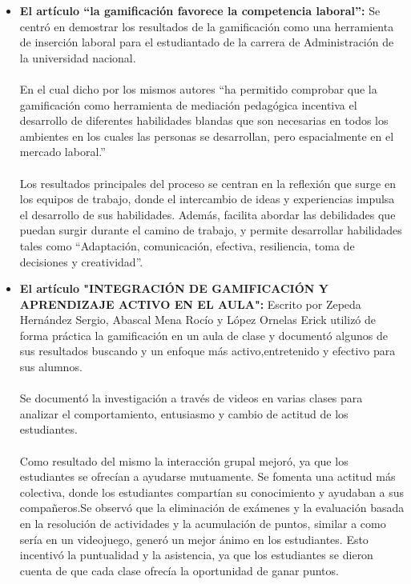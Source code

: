 \begin{itemize}
    \item \textbf{El artículo “la gamificación favorece la competencia laboral”:} Se centró en demostrar los resultados de la gamificación como una herramienta de inserción laboral para el estudiantado de la carrera de Administración de la universidad nacional.
    \\ \\
En el cual dicho por los mismos autores “ha permitido comprobar que la gamificación como herramienta de mediación pedagógica incentiva el desarrollo de diferentes habilidades blandas que son necesarias en todos los ambientes en los cuales las personas se desarrollan, pero espacialmente en el mercado laboral.”
\\ \\
Los resultados principales del proceso se centran en la reflexión que surge en los equipos de trabajo, donde el intercambio de ideas y experiencias impulsa el desarrollo de sus habilidades. Además, facilita abordar las debilidades que puedan surgir durante el camino de trabajo, y permite desarrollar habilidades tales como “Adaptación, comunicación, efectiva, resiliencia, toma de decisiones y creatividad”.\cite{m}

    \item \textbf{El artículo "INTEGRACIÓN DE GAMIFICACIÓN Y APRENDIZAJE ACTIVO EN EL AULA":}
    Escrito por Zepeda Hernández Sergio, Abascal Mena Rocío y López  Ornelas Erick utilizó de forma práctica la gamificación en un aula de clase y documentó algunos de sus resultados buscando y un enfoque más activo,entretenido y efectivo para sus alumnos.
    \\ \\
Se documentó la investigación a través de videos en varias clases para analizar el comportamiento, entusiasmo y cambio de actitud de los estudiantes.
\\ \\
Como resultado del mismo la interacción grupal mejoró, ya que los estudiantes se ofrecían a ayudarse mutuamente. Se fomenta una actitud más colectiva, donde los estudiantes compartían su conocimiento y ayudaban a sus compañeros.Se observó que la eliminación de exámenes y la evaluación basada en la resolución de actividades y la acumulación de puntos, similar a como sería en un videojuego, generó un mejor ánimo en los estudiantes. Esto incentivó la puntualidad y la asistencia, ya que los estudiantes se dieron cuenta de que cada clase ofrecía la oportunidad de ganar puntos.\cite{j}


\end{itemize}
